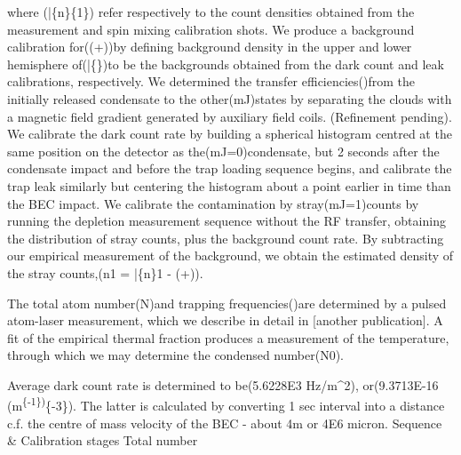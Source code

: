 where (\bar\{n\}\{1\}) refer respectively to the count densities
obtained from the measurement and spin mixing calibration shots. We
produce a background calibration for((\delta+\lambda))by defining
background density in the upper and lower hemisphere
of(\bar\{\delta\}\pm)to be the backgrounds obtained from the dark count
and leak calibrations, respectively. We determined the transfer
efficiencies(\etaJ)from the initially released condensate to the
other(mJ)states by separating the clouds with a magnetic field gradient
generated by auxiliary field coils. (Refinement pending). We calibrate
the dark count rate by building a spherical histogram centred at the
same position on the detector as the(mJ=0)condensate, but 2 seconds
after the condensate impact and before the trap loading sequence begins,
and calibrate the trap leak similarly but centering the histogram about
a point earlier in time than the BEC impact. We calibrate the
contamination by stray(mJ=1)counts by running the depletion measurement
sequence without the RF transfer, obtaining the distribution of stray
counts, plus the background count rate. By subtracting our empirical
measurement of the background, we obtain the estimated density of the
stray counts,(n1 = \bar\{n\}1 - (\delta+\lambda)).

The total atom number(N)and trapping frequencies(\omegai)are determined
by a pulsed atom-laser measurement, which we describe in detail in
{[}another publication{]}. A fit of the empirical thermal fraction
produces a measurement of the temperature, through which we may
determine the condensed number(N0).

Average dark count rate is determined to be(5.6228E3 Hz/m\^{}2),
or(9.3713E-16 (m\textsuperscript{\{-1\})}\{-3\}). The latter is
calculated by converting 1 sec interval into a distance c.f. the centre
of mass velocity of the BEC - about 4m or 4E6 micron. Sequence \&
Calibration stages Total number

